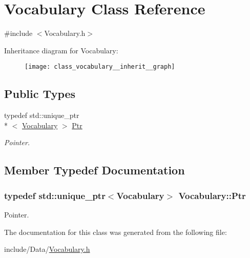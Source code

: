 \hypertarget{class_vocabulary}{\section{Vocabulary Class Reference}
\label{class_vocabulary}
}


{\ttfamily \#include $<$Vocabulary.\-h$>$}



Inheritance diagram for Vocabulary\-:\nopagebreak
\begin{figure}[H]
\begin{center}
\leavevmode
\texttt{[image: class\_vocabulary\_\_inherit\_\_graph]}
\end{center}
\end{figure}
\subsection*{Public Types}
\begin{DoxyCompactItemize}
\item 
typedef std\-::unique\-\_\-ptr\\*
$<$ \hyperlink{class_vocabulary}{Vocabulary} $>$ \hyperlink{class_vocabulary_aaeaf17c4e25e6d7c8cb3ce9598c74715}{Ptr}
\begin{DoxyCompactList}\small\item\em Pointer. \end{DoxyCompactList}\end{DoxyCompactItemize}


\subsection{Member Typedef Documentation}
\hypertarget{class_vocabulary_aaeaf17c4e25e6d7c8cb3ce9598c74715}{
\subsubsection[{Ptr}]{\setlength{\rightskip}{0pt plus 5cm}typedef std\-::unique\-\_\-ptr$<${\bf Vocabulary}$>$ {\bf Vocabulary\-::\-Ptr}}}\label{class_vocabulary_aaeaf17c4e25e6d7c8cb3ce9598c74715}


Pointer. 



The documentation for this class was generated from the following file\-:\begin{DoxyCompactItemize}
\item 
include/\-Data/\hyperlink{_vocabulary_8h}{Vocabulary.\-h}\end{DoxyCompactItemize}
